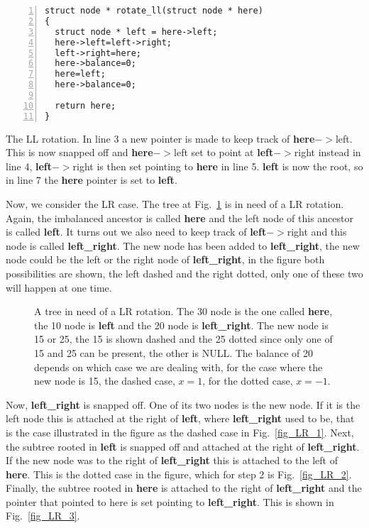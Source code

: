 \documentclass[11pt,a4paper]{scrartcl}
\begin{document}
\begin{table}
\begin{lstlisting}[numbers=left]
struct node * rotate_ll(struct node * here)
{
  struct node * left = here->left;
  here->left=left->right;
  left->right=here;
  here->balance=0;
  here=left;
  here->balance=0;

  return here;
}
\end{lstlisting}
\caption{The LL rotation. In line 3 a new pointer is made to keep
  track of \textbf{here}$->$left. This is now snapped off and \textbf{
    here}$->$left set to point at \textbf{left}$->$right instead in line 4,
  \textbf{left}$->$right is then set pointing to \textbf{here} in line 5. \textbf{
    left} is now the root, so in line 7 the \textbf{here} pointer is set
  to \textbf{left}.\label{c_LL}}
\end{table}

Now, we consider the LR case. The tree at Fig.~\ref{fig_LR} is in need
of a LR rotation. Again, the imbalanced ancestor is called \textbf{here}
and the left node of this ancestor is called \textbf{left}. It turns out
we also need to keep track of \textbf{left}$->$right and this node is
called \textbf{left\_right}. The new node has been added to \textbf{
  left\_right}, the new node could be the left or the right node of
\textbf{left\_right}, in the figure both possibilities are shown, the
left dashed and the right dotted, only one of these two will happen at
one time.

\begin{figure}
\begin{center}
\end{center}
\caption{A tree in need of a LR rotation. The 30 node is the one
  called \textbf{here}, the 10 node is \textbf{left} and the 20 node is \textbf{
    left\_right}. The new node is 15 or 25, the 15 is shown dashed and
  the 25 dotted since only one of 15 and 25 can be present, the other
  is NULL. The balance of 20 depends on which case we are dealing
  with, for the case where the new node is 15, the dashed case, $x=1$,
  for the dotted case, $x=-1$.\label{fig_LR}}
\end{figure}

Now, \textbf{left\_right} is snapped off. One of its two nodes is the new
node. If it is the left node this is attached at the right of \textbf{
  left}, where \textbf{left\_right} used to be, that is the case
illustrated in the figure as the dashed case in
Fig.~\ref{fig_LR_1}. Next, the subtree rooted in \textbf{left} is snapped
off and attached at the right of \textbf{left\_right}. If the new node
was to the right of \textbf{left\_right} this is attached to the left of
\textbf{here}. This is the dotted case in the figure, which for step 2 is
Fig.~\ref{fig_LR_2}. Finally, the subtree rooted in \textbf{here} is
attached to the right of \textbf{left\_right} and the pointer that
pointed to here is set pointing to \textbf{left\_right}. This is shown in
Fig.~\ref{fig_LR_3}.
\end{document}
